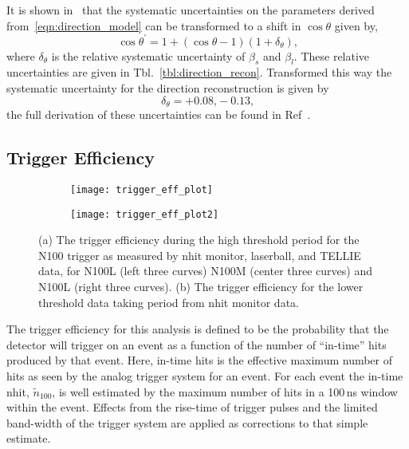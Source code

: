 It is shown in~\citep{pierre_luc_thesis} that the systematic uncertainties on the
parameters derived from~\eqref{eqn:direction_model} can be transformed to a shift
in $\cos\theta$ given by,
\begin{equation}
    \cos\theta^{\prime} = 1+(\cos\theta-1)(1+\delta_{\theta})\text{,}
\end{equation}
where $\delta_{\theta}$ is the relative systematic uncertainty of $\beta_{s}$ and $\beta_{l}$.
These relative uncertainties are given in Tbl.~\ref{tbl:direction_recon}.
Transformed this way the systematic uncertainty for the direction reconstruction
is given by
\begin{equation*}
    \delta_{\theta} = +0.08\text{,} -0.13\text{,}
\end{equation*}
the full derivation of these uncertainties can be found in Ref~\citep{snop_water_unidoc}.

\subsection{Trigger Efficiency}
\label{sec:trigeff}
\begin{figure}[htbp]
    \centering
    \begin{subfigure}{0.78\textwidth}
        \centering
    \texttt{[image: trigger\_eff\_plot]}
    \caption{}
    \end{subfigure}
    \begin{subfigure}{0.78\textwidth}
        \centering
    \texttt{[image: trigger\_eff\_plot2]}
    \end{subfigure}
    \caption[Trigger Efficiecy, Before And After Threshold Changes]{
        (a) The trigger efficiency during the high threshold period for the
        N100 trigger as measured by nhit monitor, laserball, and TELLIE data,
        for N100L (left three curves) N100M (center three curves) and N100L
        (right three curves). (b) The trigger efficiency for the lower threshold
        data taking period from nhit monitor data.}
    \label{fig:trigeff_plots}
\end{figure}

The trigger efficiency for this analysis is defined to be the probability that
the detector will trigger on an event as a function of the number of ``in-time''
hits produced by that event.
Here, in-time hits is the effective maximum number of hits as seen by the analog
trigger system for an event.
For each event the in-time nhit, $\tilde{n}_{100}$, is well
estimated by the maximum number of hits in a 100\,ns window within the event.
Effects from the rise-time of trigger pulses and the limited band-width of the
trigger system are applied as corrections to that simple estimate.

